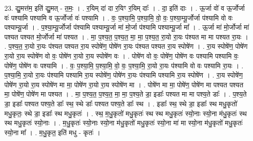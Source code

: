 \documentclass[17pt]{extarticle}
\begin{document}
23. द्यु॒मत्त॑म॒ इति॑ द्यु॒मत् - त॒मः॒ । . र॒यिम् दा॑ दा र॒यिꣳ र॒यिम् दाः᳚ । . दा॒ इति॑ दाः । . ऊ॒र्जा वो॑ व ऊ॒र्जोर्जा वः॑ पश्यामि पश्यामि व ऊ॒र्जोर्जा वः॑ पश्यामि । . वः॒ प॒श्या॒मि॒ प॒श्या॒मि॒ वो॒ वः॒ प॒श्या॒म्यू॒र्जोर्जा प॑श्यामि वो वः पश्याम्यू॒र्जा । . प॒श्या॒म्यू॒र्जोर्जा प॑श्यामि पश्याम्यू॒र्जा मा॑ मो॒र्जा प॑श्यामि पश्याम्यू॒र्जा मा᳚ । . ऊ॒र्जा मा॑ मो॒र्जोर्जा मा॑ पश्यत पश्यत मो॒र्जोर्जा मा॑ पश्यत । . मा॒ प॒श्य॒त॒ प॒श्य॒त॒ मा॒ मा॒ प॒श्य॒त॒ रा॒यो रा॒यः प॑श्यत मा मा पश्यत रा॒यः । . प॒श्य॒त॒ रा॒यो रा॒यः प॑श्यत पश्यत रा॒य स्पोषे॑ण॒ पोषे॑ण रा॒यः प॑श्यत पश्यत रा॒य स्पोषे॑ण । . रा॒य स्पोषे॑ण॒ पोषे॑ण रा॒यो रा॒य स्पोषे॑ण वो वः॒ पोषे॑ण रा॒यो रा॒य स्पोषे॑ण वः । . पोषे॑ण वो वः॒ पोषे॑ण॒ पोषे॑ण वः पश्यामि पश्यामि वः॒ पोषे॑ण॒ पोषे॑ण वः पश्यामि । . वः॒ प॒श्या॒मि॒ प॒श्या॒मि॒ वो॒ वः॒ प॒श्या॒मि॒ रा॒यो रा॒यः प॑श्यामि वो वः पश्यामि रा॒यः । . प॒श्या॒मि॒ रा॒यो रा॒यः प॑श्यामि पश्यामि रा॒य स्पोषे॑ण॒ पोषे॑ण रा॒यः प॑श्यामि पश्यामि रा॒य स्पोषे॑ण । . रा॒य स्पोषे॑ण॒ पोषे॑ण रा॒यो रा॒य स्पोषे॑ण मा मा॒ पोषे॑ण रा॒यो रा॒य स्पोषे॑ण मा । . पोषे॑ण मा मा॒ पोषे॑ण॒ पोषे॑ण मा पश्यत पश्यत मा॒ पोषे॑ण॒ पोषे॑ण मा पश्यत । . मा॒ प॒श्य॒त॒ प॒श्य॒त॒ मा॒ मा॒ प॒श्य॒ते डा॒ इडाः᳚ पश्यत मा मा पश्य॒ते डाः᳚ । . प॒श्य॒ते डा॒ इडाः᳚ पश्यत पश्य॒ते डाः᳚ स्थ॒ स्थे डाः᳚ पश्यत पश्य॒ते डाः᳚ स्थ । . इडाः᳚ स्थ॒ स्थे डा॒ इडाः᳚ स्थ मधु॒कृतो॑ मधु॒कृतः॒ स्थे डा॒ इडाः᳚ स्थ मधु॒कृतः॑ । . स्थ॒ म॒धु॒कृतो॑ मधु॒कृतः॑ स्थ स्थ मधु॒कृतः॑ स्यो॒नाः स्यो॒ना म॑धु॒कृतः॑ स्थ स्थ मधु॒कृतः॑ स्यो॒नाः । . म॒धु॒कृतः॑ स्यो॒नाः स्यो॒ना म॑धु॒कृतो॑ मधु॒कृतः॑ स्यो॒ना मा॑ मा स्यो॒ना म॑धु॒कृतो॑ मधु॒कृतः॑ स्यो॒ना मा᳚ । . म॒धु॒कृत॒ इति॑ मधु - कृतः॑ । \newline
\end{document}
